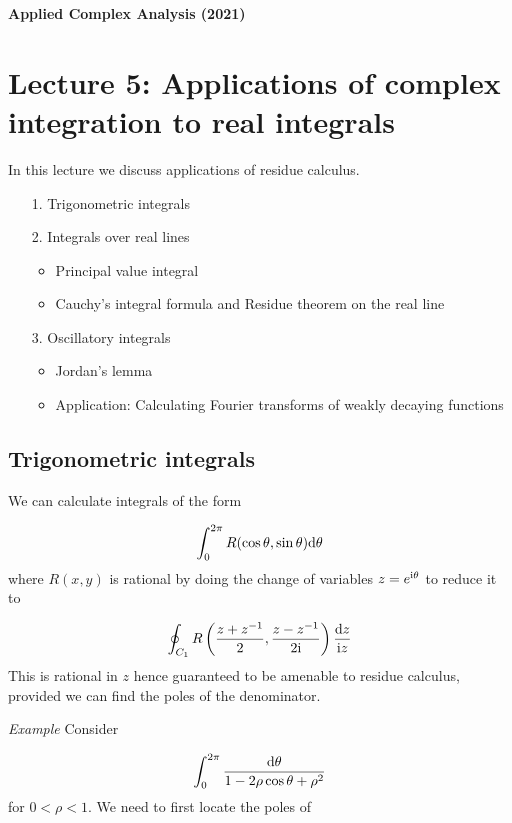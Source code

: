 \documentclass[12pt,a4paper]{article}
\def\D{ {\rm d} }
\def\I{ {\rm i} }
\begin{document}
\textbf{Applied Complex Analysis (2021)}

\section{Lecture 5: Applications of complex integration to real integrals}
In this lecture we discuss applications of residue calculus.

\begin{itemize}
\item[1. ] Trigonometric integrals


\item[2. ] Integrals over real lines

\begin{itemize}
\item Principal value integral


\item Cauchy's integral formula and Residue theorem on the real line

\end{itemize}

\item[3. ] Oscillatory integrals

\begin{itemize}
\item Jordan's lemma


\item Application: Calculating Fourier transforms of weakly decaying functions

\end{itemize}
\end{itemize}
\subsection{Trigonometric integrals}
We can calculate integrals of the form

\[
\int_0^{2 \pi} R(\cos \theta, \sin \theta) \D \theta
\]
where $R(x,y)$ is rational by doing the change of variables $z = e^{\I \theta}$ to reduce it to

\[
\oint_{C_1} R\left({z + z^{-1} \over 2}, {z - z^{-1} \over 2 \I} \right) {\D z \over \I z}
\]
This is rational in $z$ hence guaranteed to be amenable to residue calculus, provided we can find the poles of the denominator.

\emph{Example} Consider

\[
\int_0^{2\pi} {\D \theta \over 1 - 2\rho \cos \theta + \rho^2}
\]
for $0 < \rho < 1$. We need to first locate the poles of
\end{document}
